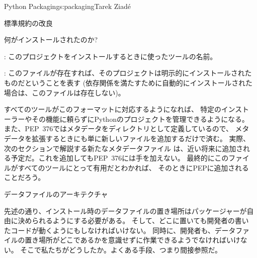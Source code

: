 \begin{aosachapter}{Python Packaging}{s:packaging}{Tarek Ziad\'{e}}
\begin{aosasect1}{標準規約の改良}
\begin{aosasect2}{何がインストールされたのか?}
\begin{aosaitemize}
  \item {}: このプロジェクトをインストールするときに使ったツールの名前。

  \item {}: このファイルが存在すれば、そのプロジェクトは明示的にインストールされたものだということを表す
             (依存関係を満たすために自動的にインストールされた場合は、このファイルは存在しない)。

\end{aosaitemize}

\noindent
すべてのツールがこのフォーマットに対応するようになれば、
特定のインストーラーやその機能に頼らずにPythonのプロジェクトを管理できるようになる。
また、PEP~376ではメタデータをディレクトリとして定義しているので、
メタデータを拡張するときにも単に新しいファイルを追加するだけで済む。
実際、次のセクションで解説する新たなメタデータファイル
は、近い将来に追加される予定だ。これを追加してもPEP~376には手を加えない。
最終的にこのファイルがすべてのツールにとって有用だとわかれば、
そのときにPEPに追加されることだろう。

\end{aosasect2}

\begin{aosasect2}{データファイルのアーキテクチャ}

先述の通り、インストール時のデータファイルの置き場所はパッケージャーが自由に決められるようにする必要がある。
そして、どこに置いても開発者の書いたコードが動くようにもしなければいけない。
同時に、開発者も、データファイルの置き場所がどこであるかを意識せずに作業できるようでなければいけない。
そこで私たちがどうしたか。よくある手段、つまり間接参照だ。


\end{aosasect2}
\end{aosasect1}
\end{aosachapter}
